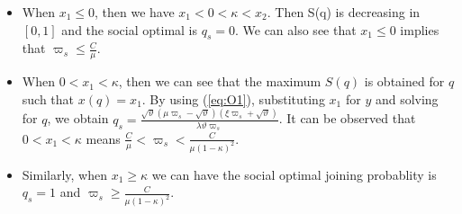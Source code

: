 \documentclass[journal]{IEEEtran}
\begin{document}
\begin{itemize}
    \item When $x_1\leq 0$, then we have $x_1<0<\kappa<x_2$. Then S(q)
    is decreasing in $[0,1]$ and the social optimal is $q_s=0$. We
    can also see that $x_1 \leq 0$ implies that $\varpi_s \leq \frac{C}{\mu}$.
    \item When $0<x_1<\kappa$, then we can see that the maximum
    $S(q)$ is obtained for $q$ such that $x(q) = x_1$. By using
    (\ref{eq:O1}), substituting $x_1$ for $y$ and solving for $q$,
    we obtain $q_s = \frac{\sqrt{\vartheta}(\mu \varpi_s -
\sqrt{\vartheta})(\xi \varpi_s + \sqrt{\vartheta})}{\lambda
\vartheta \varpi_s}$. It can be observed that $0<x_1<\kappa$ means
$\frac{C}{\mu}< \varpi_s < \frac{C}{\mu (1-\kappa)^2}$.

    \item Similarly, when $x_1 \geq \kappa$ we can have the social
    optimal joining probablity is $q_s = 1$ and $\varpi_s \geq \frac{C}{\mu (1-\kappa)^2}$.
\end{itemize}
\end{document}
